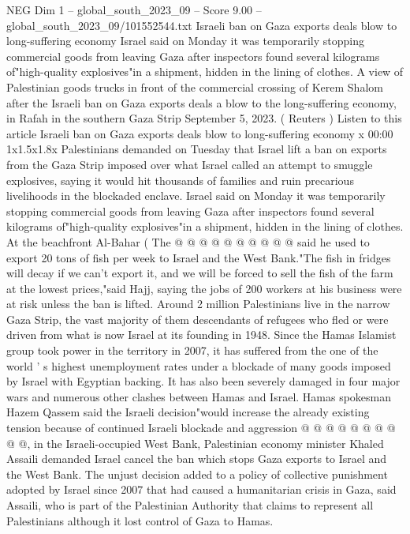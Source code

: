 \begin{textsample}{NEG Dim 1 – global\_south\_2023\_09 – Score 9.00 – global\_south\_2023\_09/101552544.txt}  \label{ex:f1_neg_005}
Israeli ban on Gaza exports deals blow to long-suffering economy Israel said on Monday it was temporarily stopping commercial goods from leaving Gaza after inspectors found several kilograms of"high-quality explosives"in a shipment, hidden in the lining of clothes.
A view of Palestinian goods trucks in front of the commercial crossing of Kerem Shalom after the Israeli ban on Gaza exports deals a blow to the long-suffering economy, in Rafah in the southern Gaza Strip September 5, 2023. ( Reuters ) Listen to this article Israeli ban on Gaza exports deals blow to long-suffering economy x 00:00 1x1.5x1.8x Palestinians demanded on Tuesday that Israel lift a ban on exports from the Gaza Strip imposed over what Israel called an attempt to smuggle explosives, saying it would hit thousands of families and ruin precarious livelihoods in the blockaded enclave.
Israel said on Monday it was temporarily stopping commercial goods from leaving Gaza after inspectors found several kilograms of"high-quality explosives"in a shipment, hidden in the lining of clothes.
At the beachfront Al-Bahar ( The @ @ @ @ @ @ @ @ @ @ said he used to export 20 tons of fish per week to Israel and the West Bank."The fish in fridges will decay if we can't export it, and we will be forced to sell the fish of the farm at the lowest prices,"said Hajj, saying the jobs of 200 workers at his business were at risk unless the ban is lifted.
Around 2 million Palestinians live in the narrow Gaza Strip, the vast majority of them descendants of refugees who fled or were driven from what is now Israel at its founding in 1948.
Since the Hamas Islamist group took power in the territory in 2007, it has suffered from the one of the world ' s highest unemployment rates under a blockade of many goods imposed by Israel with Egyptian backing.
It has also been severely damaged in four major wars and numerous other clashes between Hamas and Israel.
Hamas spokesman Hazem Qassem said the Israeli decision"would increase the already existing tension because of continued Israeli blockade and aggression @ @ @ @ @ @ @ @ @ @, in the Israeli-occupied West Bank, Palestinian economy minister Khaled Assaili demanded Israel cancel the ban which stops Gaza exports to Israel and the West Bank.
The unjust decision added to a policy of collective punishment adopted by Israel since 2007 that had caused a humanitarian crisis in Gaza, said Assaili, who is part of the Palestinian Authority that claims to represent all Palestinians although it lost control of Gaza to Hamas.

\end{textsample}
